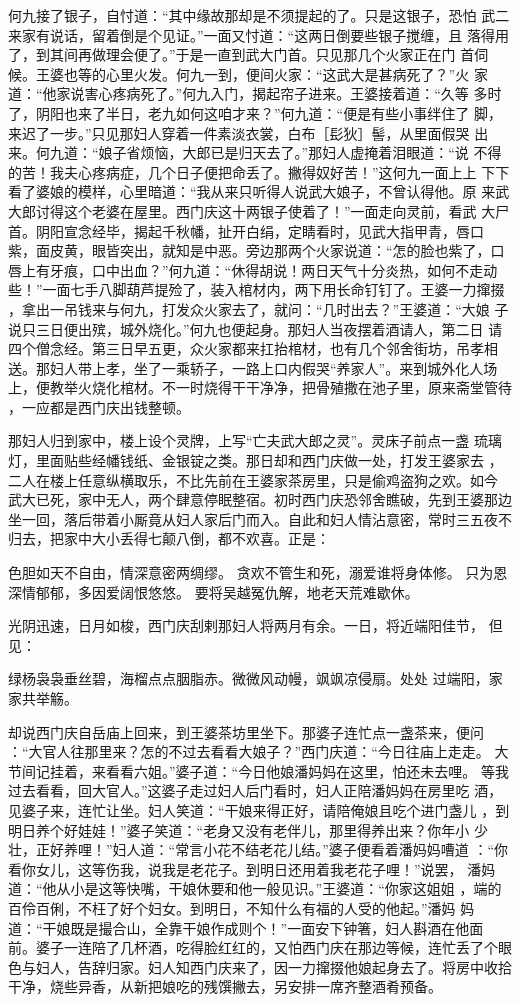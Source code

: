 何九接了银子，自忖道：“其中缘故那却是不须提起的了。只是这银子，恐怕
武二来家有说话，留着倒是个见证。”一面又忖道：“这两日倒要些银子搅缠，且
落得用了，到其间再做理会便了。”于是一直到武大门首。只见那几个火家正在门
首伺候。王婆也等的心里火发。何九一到，便间火家：“这武大是甚病死了？”火
家道：“他家说害心疼病死了。”何九入门，揭起帘子进来。王婆接着道：“久等
多时了，阴阳也来了半日，老九如何这咱才来？”何九道：“便是有些小事绊住了
脚，来迟了一步。”只见那妇人穿着一件素淡衣裳，白布［髟狄］髻，从里面假哭
出来。何九道：“娘子省烦恼，大郎已是归天去了。”那妇人虚掩着泪眼道：“说
不得的苦！我夫心疼病症，几个日子便把命丢了。撇得奴好苦！”这何九一面上上
下下看了婆娘的模样，心里暗道：“我从来只听得人说武大娘子，不曾认得他。原
来武大郎讨得这个老婆在屋里。西门庆这十两银子使着了！”一面走向灵前，看武
大尸首。阴阳宣念经毕，揭起千秋幡，扯开白绢，定睛看时，见武大指甲青，唇口
紫，面皮黄，眼皆突出，就知是中恶。旁边那两个火家说道：“怎的脸也紫了，口
唇上有牙痕，口中出血？”何九道：“休得胡说！两日天气十分炎热，如何不走动
些！”一面七手八脚葫芦提殓了，装入棺材内，两下用长命钉钉了。王婆一力撺掇
，拿出一吊钱来与何九，打发众火家去了，就问：“几时出去？”王婆道：“大娘
子说只三日便出殡，城外烧化。”何九也便起身。那妇人当夜摆着酒请人，第二日
请四个僧念经。第三日早五更，众火家都来扛抬棺材，也有几个邻舍街坊，吊孝相
送。那妇人带上孝，坐了一乘轿子，一路上口内假哭“养家人”。来到城外化人场
上，便教举火烧化棺材。不一时烧得干干净净，把骨殖撒在池子里，原来斋堂管待
，一应都是西门庆出钱整顿。

那妇人归到家中，楼上设个灵牌，上写“亡夫武大郎之灵”。灵床子前点一盏
琉璃灯，里面贴些经幡钱纸、金银锭之类。那日却和西门庆做一处，打发王婆家去
，二人在楼上任意纵横取乐，不比先前在王婆家茶房里，只是偷鸡盗狗之欢。如今
武大已死，家中无人，两个肆意停眠整宿。初时西门庆恐邻舍瞧破，先到王婆那边
坐一回，落后带着小厮竟从妇人家后门而入。自此和妇人情沾意密，常时三五夜不
归去，把家中大小丢得七颠八倒，都不欢喜。正是：

色胆如天不自由，情深意密两绸缪。
贪欢不管生和死，溺爱谁将身体修。
只为恩深情郁郁，多因爱阔恨悠悠。
要将吴越冤仇解，地老天荒难歇休。

光阴迅速，日月如梭，西门庆刮剌那妇人将两月有余。一日，将近端阳佳节，
但见：

绿杨袅袅垂丝碧，海榴点点胭脂赤。微微风动幔，飒飒凉侵扇。处处
过端阳，家家共举觞。

却说西门庆自岳庙上回来，到王婆茶坊里坐下。那婆子连忙点一盏茶来，便问
：“大官人往那里来？怎的不过去看看大娘子？”西门庆道：“今日往庙上走走。
大节间记挂着，来看看六姐。”婆子道：“今日他娘潘妈妈在这里，怕还未去哩。
等我过去看看，回大官人。”这婆子走过妇人后门看时，妇人正陪潘妈妈在房里吃
酒，见婆子来，连忙让坐。妇人笑道：“干娘来得正好，请陪俺娘且吃个进门盏儿
，到明日养个好娃娃！”婆子笑道：“老身又没有老伴儿，那里得养出来？你年小
少壮，正好养哩！”妇人道：“常言小花不结老花儿结。”婆子便看着潘妈妈嘈道
：“你看你女儿，这等伤我，说我是老花子。到明日还用着我老花子哩！”说罢，
潘妈道：“他从小是这等快嘴，干娘休要和他一般见识。”王婆道：“你家这姐姐
，端的百伶百俐，不枉了好个妇女。到明日，不知什么有福的人受的他起。”潘妈
妈道：“干娘既是撮合山，全靠干娘作成则个！”一面安下钟箸，妇人斟酒在他面
前。婆子一连陪了几杯酒，吃得脸红红的，又怕西门庆在那边等候，连忙丢了个眼
色与妇人，告辞归家。妇人知西门庆来了，因一力撺掇他娘起身去了。将房中收拾
干净，烧些异香，从新把娘吃的残馔撇去，另安排一席齐整酒肴预备。

